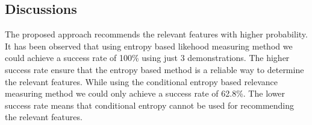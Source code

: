 \subsection{Discussions}
The proposed approach recommends the relevant features with higher probability.
It has been observed that using entropy based likehood measuring method we could
achieve a success rate of 100\% using just 3 demonstrations.
The higher success rate ensure that the entropy based method is a reliable way to
determine the relevant features.
While using the conditional entropy based relevance measuring method we could 
only achieve a success rate of 62.8\%. 
The lower success rate means that conditional entropy cannot be used for recommending 
the relevant features.

